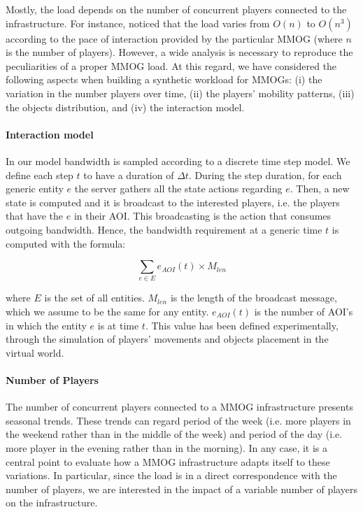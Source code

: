 \documentclass[final,10pt,a5paper]{phdimt}
\theoremstyle{definition}
\begin{document}
Mostly, the load depends on the number of concurrent players connected to the infrastructure.
For instance, \cite{Nae2008} noticed that the load varies from $O(n)$ to $O(n^3)$ according to the pace of interaction provided by the particular MMOG (where $n$ is the number of players). However, a wide analysis is necessary to reproduce the peculiarities of a proper MMOG load. At this regard, we have considered the following aspects when building a synthetic workload for MMOGs: (i) the variation in the number players over time, (ii) the players’ mobility patterns, (iii) the objects distribution, and (iv) the interaction model.




\paragraph{Interaction model}

In our model bandwidth is sampled according to a discrete time step model.
We define each step $t$ to have a duration of $\Delta t$.
During the step duration, for each generic entity $e$ the server gathers all the state actions regarding $e$.
Then, a new state is computed and it is broadcast to the interested players, i.e. the players that have the $e$ in their AOI.
This broadcasting is the action that consumes outgoing bandwidth. Hence, the bandwidth requirement at a generic time $t$ is computed with the formula:

\begin{equation}
\sum_{e \in E}{e_{AOI}(t)} \times M_{len}
\end{equation} 


\noindent
where $E$ is the set of all entities. $M_{len}$ is the length of the broadcast message, which we assume to be the same for any entity.
$e_{AOI}(t)$ is the number of AOI's in which the entity $e$ is at time $t$. This value has been defined experimentally, through the simulation of players’ movements and objects placement in the virtual world.




\paragraph{Number of Players}

The number of concurrent players connected to a MMOG infrastructure presents seasonal trends. These trends can regard period of the week (i.e. more players in the weekend rather than in the middle of the week) and period of the day (i.e. more player in the evening rather than in the morning). In any case, it is a central point to evaluate how a MMOG infrastructure adapts itself to these variations. In particular, since the load is in a direct correspondence with the number of players, we are interested in the impact of a variable number of players on the infrastructure.
\end{document}
